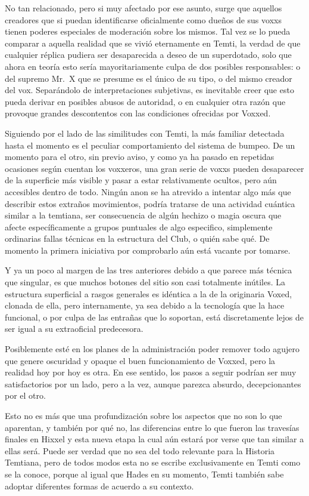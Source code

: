 \documentclass[
]{book}
\begin{document}
No tan relacionado, pero si muy afectado por ese asunto, surge que aquellos creadores que si puedan identificarse oficialmente como dueños de sus voxxs tienen poderes especiales de moderación sobre los mismos. Tal vez se lo pueda comparar a aquella realidad que se vivió eternamente en Temti, la verdad de que cualquier réplica pudiera ser desaparecida a deseo de un superdotado, solo que ahora en teoría esto sería mayoritariamente culpa de dos posibles responsables: o del supremo Mr.~X que se presume es el único de su tipo, o del mismo creador del vox. Separándolo de interpretaciones subjetivas, es inevitable creer que esto pueda derivar en posibles abusos de autoridad, o en cualquier otra razón que provoque grandes descontentos con las condiciones ofrecidas por Voxxed.

Siguiendo por el lado de las similitudes con Temti, la más familiar detectada hasta el momento es el peculiar comportamiento del sistema de bumpeo. De un momento para el otro, sin previo aviso, y como ya ha pasado en repetidas ocasiones según cuentan los voxxeros, una gran serie de voxxs pueden desaparecer de la superficie más visible y pasar a estar relativamente ocultos, pero aún accesibles dentro de todo. Ningún anon se ha atrevido a intentar algo más que describir estos extraños movimientos, podría tratarse de una actividad cuántica similar a la temtiana, ser consecuencia de algún hechizo o magia oscura que afecte específicamente a grupos puntuales de algo especifico, simplemente ordinarias fallas técnicas en la estructura del Club, o quién sabe qué. De momento la primera iniciativa por comprobarlo aún está vacante por tomarse.

Y ya un poco al margen de las tres anteriores debido a que parece más técnica que singular, es que muchos botones del sitio son casi totalmente inútiles. La estructura superficial a rasgos generales es idéntica a la de la originaria Voxed, clonada de ella, pero internamente, ya sea debido a la tecnología que la hace funcional, o por culpa de las entrañas que lo soportan, está discretamente lejos de ser igual a su extraoficial predecesora.

Posiblemente esté en los planes de la administración poder remover todo agujero que genere oscuridad y opaque el buen funcionamiento de Voxxed, pero la realidad hoy por hoy es otra. En ese sentido, los pasos a seguir podrían ser muy satisfactorios por un lado, pero a la vez, aunque parezca absurdo, decepcionantes por el otro.

Esto no es más que una profundización sobre los aspectos que no son lo que aparentan, y también por qué no, las diferencias entre lo que fueron las travesías finales en Hixxel y esta nueva etapa la cual aún estará por verse que tan similar a ellas será. Puede ser verdad que no sea del todo relevante para la Historia Temtiana, pero de todos modos esta no se escribe exclusivamente en Temti como se la conoce, porque al igual que Hades en su momento, Temti también sabe adoptar diferentes formas de acuerdo a su contexto.
\end{document}
